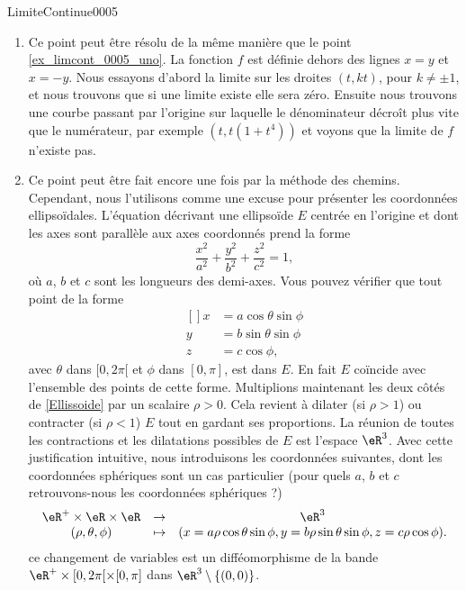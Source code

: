 \begin{corrige}{LimiteContinue0005}
\begin{enumerate}
                            \item Ce point peut être résolu de la même manière que le point \ref{ex_limcont_0005_uno}. La fonction $f$ est définie dehors des lignes $x=y$ et $x=-y$.  Nous essayons d'abord la limite sur les droites $(t,kt)$, pour $k\neq \pm 1$, et nous trouvons que si une limite existe elle sera zéro. Ensuite nous trouvons une courbe passant par l'origine sur laquelle le dénominateur décroît plus vite que le numérateur, par exemple $(t, t(1+t^4))$ et voyons que la limite de $f$ n'existe pas.
                              \item Ce point peut être fait encore une fois par la méthode des chemins. Cependant, nous l'utilisons comme une excuse pour présenter les coordonnées ellipsoïdales.  L'équation décrivant une ellipsoïde $E$ centrée en l'origine et dont les axes sont parallèle aux axes coordonnés prend la forme 
                                \begin{equation}\label{Ellissoide}
                                  \frac{x^2}{a^2}+\frac{y^2}{b^2}+\frac{z^2}{c^2}=1,
                                \end{equation}
                                où $a$, $b$ et $c$ sont les longueurs des demi-axes. Vous pouvez vérifier que tout point de la forme  
				\begin{equation}
					\begin{aligned}[]
                                    		x&=a\cos\theta\sin\phi\\
						y&=b\sin\theta\sin\phi\\
						z&=c\cos\phi,
					\end{aligned}
				\end{equation}
                                avec  $\theta$ dans $[0,2\pi[$ et $\phi$ dans $[0,\pi]$, est dans $E$. En fait $E$ coïncide avec l'ensemble des points de cette forme. Multiplions maintenant les deux côtés de \eqref{Ellissoide} par un scalaire $\rho>0$. Cela revient à  dilater (si $\rho >1$) ou contracter (si $\rho <1$) $E$ tout en gardant ses proportions. La réunion de toutes les contractions et les dilatations possibles de $E$ est l'espace $\eR^3$.  Avec cette justification intuitive, nous introduisons les coordonnées suivantes, dont les coordonnées sphériques sont un cas particulier (pour quels $a$, $b$ et $c$ retrouvons-nous les coordonnées sphériques ?)
                                    \begin{equation}
                                      \begin{array}{ccc}
                                        \eR^+\times \eR\times \eR& \to& \eR^3\\ 
                                       (\rho, \theta,\phi )&\mapsto&( x=a\rho\cos\theta\sin\phi, y=b\rho\sin\theta\sin\phi, z=c\rho\cos\phi).
                                      \end{array}
                                      \end{equation}
                                    ce changement de variables est un difféomorphisme de la bande $ \eR^+\times [0,2\pi[\times[0,\pi]$ dans $\eR^3\setminus\{(0,0)\}$.


\end{enumerate}
\end{corrige}
